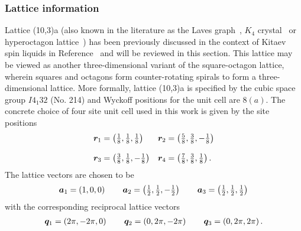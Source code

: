 \subsubsection{Lattice information}
%
%
Lattice (10,3)a (also known in the literature as the Laves graph~\cite{HeeschZFK1933}, $K_4$ crystal~\cite{SunadaAMS2008} or hyperoctagon lattice~\cite{HermannsPRB2014}) has been previously discussed in the context of Kitaev spin liquids in Reference~\cite{HermannsPRB2014} and will be reviewed in this section.
This lattice may be viewed as another three-dimensional variant of the square-octagon lattice, wherein squares and octagons form counter-rotating spirals to form a three-dimensional lattice.
More formally, lattice (10,3)a is specified by the cubic space group $I4_{1}32$ (No. 214) and Wyckoff positions for the unit cell are $8(a)$.
The concrete choice of four site unit cell used in this work is given by the site positions
%
\begin{equation}
	\begin{matrix*}[l]
		\br_1 = \left(\frac{1}{8}, \frac{1}{8}, \frac{1}{8}\right) &
		\br_2 = \left(\frac{5}{8}, \frac{3}{8}, -\frac{1}{8}\right) \\
		&\\
		\br_3 = \left(\frac{3}{8}, \frac{1}{8}, -\frac{1}{8}\right) &
		\br_4 = \left(\frac{7}{8}, \frac{3}{8}, \frac{1}{8}\right).
	\end{matrix*}
\end{equation}
%
The lattice vectors are chosen to be
%
\begin{equation}
	\begin{matrix*}[l]
		\ba_1 = \left(1, 0, 0\right) \qquad
		\ba_2 = \left(\frac{1}{2}, \frac{1}{2}, -\frac{1}{2}\right) \qquad
		\ba_3 = \left(\frac{1}{2}, \frac{1}{2}, \frac{1}{2}\right)
	\end{matrix*}
\end{equation}
%
with the corresponding reciprocal lattice vectors
%
\begin{equation}
	\begin{matrix*}[l]
		\bq_1 = \left(2\pi, -2\pi, 0\right) \qquad
		\bq_2 = \left(0, 2\pi, -2\pi\right) \qquad
		\bq_3 = \left(0, 2\pi, 2\pi\right).
	\end{matrix*}
\end{equation}
%

